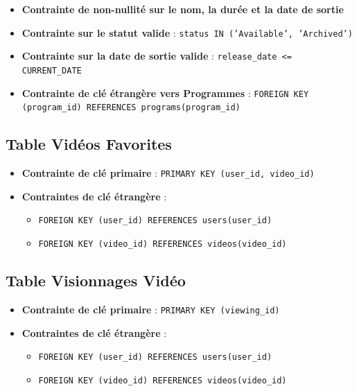 \documentclass{article}
\begin{document}
\begin{itemize}
    \item \textbf{Contrainte de non-nullité sur le nom, la durée et la date de sortie}
    \item \textbf{Contrainte sur le statut valide} : \texttt{status IN ('Available', 'Archived')}
    \item \textbf{Contrainte sur la date de sortie valide} : \texttt{release\_date <= CURRENT\_DATE}
    \item \textbf{Contrainte de clé étrangère vers Programmes} : \texttt{FOREIGN KEY (program\_id) REFERENCES programs(program\_id)}
\end{itemize}

\subsection{Table Vidéos Favorites}

\begin{itemize}
    \item \textbf{Contrainte de clé primaire} : \texttt{PRIMARY KEY (user\_id, video\_id)}
    \item \textbf{Contraintes de clé étrangère} :
    \begin{itemize}
        \item \texttt{FOREIGN KEY (user\_id) REFERENCES users(user\_id)}
        \item \texttt{FOREIGN KEY (video\_id) REFERENCES videos(video\_id)}
    \end{itemize}
\end{itemize}

\subsection{Table Visionnages Vidéo}

\begin{itemize}
    \item \textbf{Contrainte de clé primaire} : \texttt{PRIMARY KEY (viewing\_id)}
    \item \textbf{Contraintes de clé étrangère} :
    \begin{itemize}
        \item \texttt{FOREIGN KEY (user\_id) REFERENCES users(user\_id)}
        \item \texttt{FOREIGN KEY (video\_id) REFERENCES videos(video\_id)}
    \end{itemize}
\end{itemize}
\end{document}
